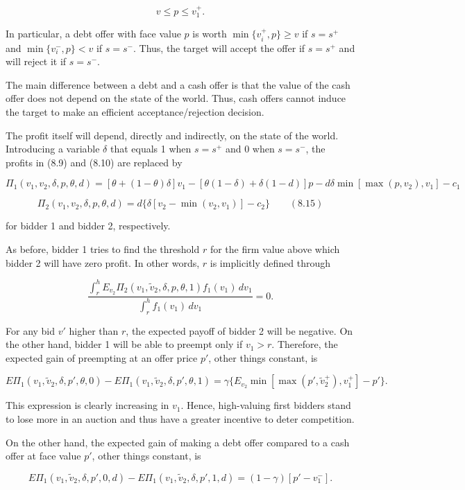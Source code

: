 \documentclass[11pt,a4paper]{article}
\begin{document}
\[v \leq p \leq v_1^+.\]

In particular, a debt offer with face value \(p\) is worth \(\min\{v_i^+, p\} \geq v\) if
\(s = s^+\) and \(\min\{v_i^-, p\} < v\) if \(s = s^-\). Thus, the target will accept the offer if
\(s = s^+\) and will reject it if \(s = s^-\).

The main difference between a debt and a cash offer is that the value of the cash offer does not
depend on the state of the world. Thus, cash offers cannot induce the target to make an efficient
acceptance/rejection decision.

The profit itself will depend, directly and indirectly, on the state of the world. Introducing a
variable \(\delta\) that equals 1 when \(s = s^+\) and 0 when \(s = s^-\), the profits in (8.9) and
(8.10) are replaced by

\[\Pi_1(v_1, v_2, \delta, p, \theta, d) = [\theta + (1 - \theta)\delta]v_1 - [\theta(1 - \delta) + \delta(1 - d)]p - d\delta \min[\max(p, v_2), v_1] - c_1\]

\[\Pi_2(v_1, v_2, \delta, p, \theta, d) = d\{\delta[v_2 - \min(v_2, v_1)] - c_2\} \qquad (8.15)\]

for bidder 1 and bidder 2, respectively.

As before, bidder 1 tries to find the threshold \(r\) for the firm value above which bidder 2 will
have zero profit. In other words, \(r\) is implicitly defined through

\[\frac{\int_r^h E_{v_2}\Pi_2(v_1, \tilde v_2, \delta, p, \theta, 1) f_1(v_1)\, dv_1}{\int_r^h f_1(v_1)\, dv_1} = 0.\]

For any bid \(v'\) higher than \(r\), the expected payoff of bidder 2 will be negative. On the other
hand, bidder 1 will be able to preempt only if \(v_1 > r\). Therefore, the expected gain of
preempting at an offer price \(p'\), other things constant, is

\[E\Pi_1(v_1, \tilde v_2, \delta, p', \theta, 0) - E\Pi_1(v_1, \tilde v_2, \delta, p', \theta, 1) = \gamma\{E_{v_2}\min[\max(p', \tilde v_2^+), v_1^+] - p'\}.\]

This expression is clearly increasing in \(v_1\). Hence, high-valuing first bidders stand to lose
more in an auction and thus have a greater incentive to deter competition.

On the other hand, the expected gain of making a debt offer compared to a cash offer at face value
\(p'\), other things constant, is

\[E\Pi_1(v_1, \tilde v_2, \delta, p', 0, d) - E\Pi_1(v_1, \tilde v_2, \delta, p', 1, d) = (1 - \gamma)[p' - v_1^-].\]
\end{document}
